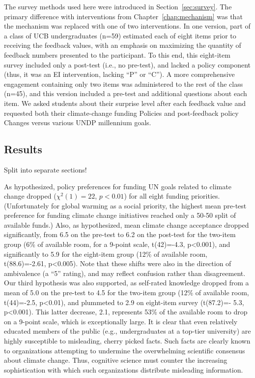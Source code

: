 The survey methods used here were introduced in Section~\ref{sec:survey}. The
primary difference with interventions from Chapter~\ref{chap:mechanism} was that
the mechanism was replaced with one of two interventions. In one version, part
of a class of UCB undergraduates (n=59) estimated each of eight items prior to
receiving the feedback values, with an emphasis on maximizing the quantity of
feedback numbers presented to the participant. To this end, this eight-item
survey included only a post-test (i.e., no pre-test), and lacked a policy
component (thus, it was an EI intervention, lacking ``P'' or ``C''). A more
comprehensive engagement containing only two items was administered to the rest
of the class (n=45), and this version included a pre-test and additional
questions about each item. We asked students about their surprise level after
each feedback value and requested both their climate-change funding Policies and
post-feedback policy Changes versus various UNDP millennium goals.

\subsection{Results}

Split into separate sections! 

As hypothesized, policy preferences for funding UN goals
related to climate change dropped ($\chi^2(1)=22$, $p<0.01$) for all eight funding
priorities. (Unfortunately for global warming as a social priority, the highest
mean pre-test preference for funding climate change initiatives reached only a
50-50 split of available funds.) Also, as hypothesized, mean climate change
acceptance dropped significantly, from 6.5 on the pre-test to 6.2 on the
post-test for the two-item group (6\% of available room, for a 9-point scale,
t(42)=-4.3, p<0.001), and significantly to 5.9 for the eight-item group (12\% of
available room, t(88.6)=‑2.61, p<0.005). Note that these shifts were also in the
direction of ambivalence (a ``5'' rating), and may reflect confusion rather than
disagreement. Our third hypothesis was also supported, as self-rated knowledge
dropped from a mean of 5.0 on the pre-test to 4.5 for the two-item group (12\% of
available room, t(44)=-2.5, p<0.01), and plummeted to 2.9 on eight-item survey
(t(87.2)=- 5.3, p<0.001). This latter decrease, 2.1, represents 53\% of the
available room to drop on a 9-point scale, which is exceptionally large.  It is
clear that even relatively educated members of the public (e.g., undergraduates
at a top-tier university) are highly susceptible to misleading, cherry picked
facts. Such facts are clearly known to organizations attempting to undermine the
overwhelming scientific consensus about climate change. Thus, cognitive science
must counter the increasing sophistication with which such organizations
distribute misleading information.

